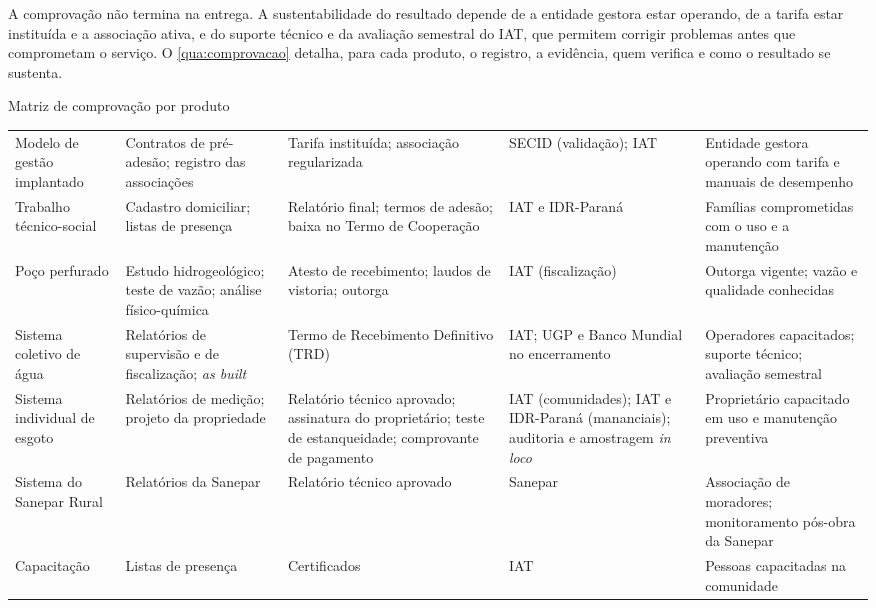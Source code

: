 A comprovação não termina na entrega. A sustentabilidade do resultado depende
de a entidade gestora estar operando, de a tarifa estar instituída e a
associação ativa, e do suporte técnico e da avaliação semestral do IAT, que
permitem corrigir problemas antes que comprometam o serviço. O
\autoref{qua:comprovacao} detalha, para cada produto, o registro, a evidência,
quem verifica e como o resultado se sustenta.

\begin{quadro}[H]
\caption{Matriz de comprovação por produto}
\label{qua:comprovacao}
\scriptsize
\renewcommand{\arraystretch}{1.3}
\setlength{\tabcolsep}{4pt}
\begin{tabularx}{\textwidth}{|P{2.3cm}|L|L|L|L|}
\hline
{} &  &  &
 &  \\ \hline
Modelo de gestão implantado & Contratos de pré-adesão; registro das associações &
  Tarifa instituída; associação regularizada & SECID (validação); IAT &
  Entidade gestora operando com tarifa e manuais de desempenho \\ \hline
Trabalho técnico-social & Cadastro domiciliar; listas de presença &
  Relatório final; termos de adesão; baixa no Termo de Cooperação & IAT e IDR-Paraná &
  Famílias comprometidas com o uso e a manutenção \\ \hline
Poço perfurado & Estudo hidrogeológico; teste de vazão; análise físico-química &
  Atesto de recebimento; laudos de vistoria; outorga & IAT (fiscalização) &
  Outorga vigente; vazão e qualidade conhecidas \\ \hline
Sistema coletivo de água & Relatórios de supervisão e de fiscalização; \textit{as built} &
  Termo de Recebimento Definitivo (TRD) & IAT; UGP e Banco Mundial no encerramento &
  Operadores capacitados; suporte técnico; avaliação semestral \\ \hline
Sistema individual de esgoto & Relatórios de medição; projeto da propriedade &
  Relatório técnico aprovado; assinatura do proprietário; teste de estanqueidade;
  comprovante de pagamento & IAT (comunidades); IAT e IDR-Paraná (mananciais);
  auditoria e amostragem \textit{in loco} & Proprietário capacitado em uso e
  manutenção preventiva \\ \hline
Sistema do Sanepar Rural & Relatórios da Sanepar & Relatório técnico aprovado &
  Sanepar & Associação de moradores; monitoramento pós-obra da Sanepar \\ \hline
Capacitação & Listas de presença & Certificados & IAT &
  Pessoas capacitadas na comunidade \\ \hline
\end{tabularx}
\end{quadro}

